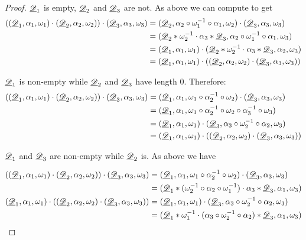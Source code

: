 \begin{proof}
\smallskip \noindent  $\underline{\mathscr{D}}_1$ is empty, $\underline{\mathscr{D}}_2$ and $\underline{\mathscr{D}}_3$ are not. As above we can compute to get
\begin{align*}
((\underline{\mathscr{D}}_1, \alpha_1, \omega_1)\cdot (\underline{\mathscr{D}}_2, \alpha_2, \omega_2)) \cdot (\underline{\mathscr{D}}_3, \alpha_3, \omega_3)&=(\underline{\mathscr{D}}_2, \alpha_2\circ \omega^{-1}_1 \circ \alpha_1, \omega_2)\cdot (\underline{\mathscr{D}}_3, \alpha_3, \omega_3)\\&=(\underline{\mathscr{D}}_2*\omega^{-1}_2\cdot \alpha_3*\underline{\mathscr{D}}_3, \alpha_2\circ \omega^{-1}_1 \circ \alpha_1, \omega_3 )\\&=(\underline{\mathscr{D}}_1, \alpha_1, \omega_1) \cdot (\underline{\mathscr{D}}_2*\omega^{-1}_2\cdot \alpha_3*\underline{\mathscr{D}}_3, \alpha_2, \omega_3 )\\&=(\underline{\mathscr{D}}_1, \alpha_1, \omega_1) \cdot ((\underline{\mathscr{D}}_2, \alpha_2, \omega_2) \cdot (\underline{\mathscr{D}}_3, \alpha_3, \omega_3)  )
\end{align*}

\smallskip \noindent $\underline{\mathscr{D}}_1$ is non-empty while $\underline{\mathscr{D}}_2$ and $\underline{\mathscr{D}}_3$ have length $0$. Therefore:
\begin{align*}
	((\underline{\mathscr{D}}_1, \alpha_1, \omega_1)\cdot (\underline{\mathscr{D}}_2, \alpha_2, \omega_2)) \cdot (\underline{\mathscr{D}}_3, \alpha_3, \omega_3)&=(\underline{\mathscr{D}}_1, \alpha_1, \omega_1\circ \alpha^{-1}_2\circ \omega_2)\cdot (\underline{\mathscr{D}}_3, \alpha_3, \omega_3)\\&=(\underline{\mathscr{D}}_1, \alpha_1, \omega_1\circ \alpha^{-1}_2\circ \omega_2\circ \alpha^{-1}_3 \circ \omega_3 )\\&=(\underline{\mathscr{D}}_1, \alpha_1, \omega_1) \cdot (\underline{\mathscr{D}}_3, \alpha_3\circ \omega^{-1}_2\circ \alpha_2, \omega_3)\\&=(\underline{\mathscr{D}}_1, \alpha_1, \omega_1) \cdot ((\underline{\mathscr{D}}_2, \alpha_2, \omega_2) \cdot (\underline{\mathscr{D}}_3, \alpha_3, \omega_3)  )
\end{align*}


\smallskip \noindent $\underline{\mathscr{D}}_1$ and $\underline{\mathscr{D}}_3$ are non-empty while $\underline{\mathscr{D}}_2$ is. As above we have 

\begin{align*}
	((\underline{\mathscr{D}}_1, \alpha_1, \omega_1)\cdot (\underline{\mathscr{D}}_2, \alpha_2, \omega_2)) \cdot (\underline{\mathscr{D}}_3, \alpha_3, \omega_3)&=(\underline{\mathscr{D}}_1, \alpha_1, \omega_1\circ \alpha^{-1}_2\circ \omega_2)\cdot (\underline{\mathscr{D}}_3, \alpha_3, \omega_3)\\&=(\underline{\mathscr{D}}_1*(\omega^{-1}_2\circ \alpha_2\circ \omega^{-1}_1)\cdot \alpha_3*\underline{\mathscr{D}}_3, \alpha_1, \omega_3 )\\(\underline{\mathscr{D}}_1, \alpha_1, \omega_1) \cdot ((\underline{\mathscr{D}}_2, \alpha_2, \omega_2) \cdot (\underline{\mathscr{D}}_3, \alpha_3, \omega_3)  )&=(\underline{\mathscr{D}}_1, \alpha_1, \omega_1) \cdot (\underline{\mathscr{D}}_3, \alpha_3\circ \omega^{-1}_2\circ \alpha_2, \omega_3)\\&=(\underline{\mathscr{D}}_1*\omega^{-1}_1\cdot (\alpha_3\circ \omega^{-1}_2 \circ \alpha_2)*\underline{\mathscr{D}}_3, \alpha_1, \omega_3)
\end{align*}


\end{proof}
